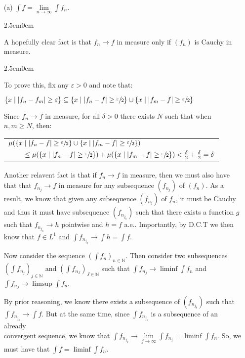 \documentclass{book}
\newcommand{\exTwoP}{%
   \color{RedViolet}%
   \fontsize{13}{15}\selectfont%
}
\newcommand{\exPPP}{%
   \color{VioletRed}%
   \fontsize{12}{14}\selectfont%
}
\newenvironment{myIndent}{%
   \begin{adjustwidth}{2.5em}{0em}%
}{%
   \end{adjustwidth}%
}
\newcommand{\retTwo}{\hfill\bigbreak}
\begin{document}
\begin{enumerate}
	\item[(a)] $\int f = \lim\limits_{n \rightarrow \infty}\int f_n$.
	
	\begin{myIndent}\exTwoP
		A hopefully clear fact is that $f_n \rightarrow f$ in measure only if $(f_n)$ is Cauchy in\\ measure. 
		\begin{myIndent}\exPPP
			To prove this, fix any $\varepsilon > 0$ and note that:
	
			{\centering $\{x \mid |f_n - f_m| \geq \varepsilon\} \subseteq \{x \mid |f_n - f| \geq \sfrac{\varepsilon}{2}\} \cup \{x \mid |f_m - f| \geq \sfrac{\varepsilon}{2}\}$ \retTwo\par}
	
			Since $f_n \rightarrow f$ in measure, for all $\delta > 0$ there exists $N$ such that when $n, m \geq N$, then:
	
			
			{\centering\begin{tabular}{l}
				$\mu(\{x \mid |f_n - f| \geq \sfrac{\varepsilon}{2}\} \cup \{x \mid |f_m - f| \geq \sfrac{\varepsilon}{2}\})$\\
				$\phantom{aaaa} \leq \mu(\{x \mid |f_n - f| \geq \sfrac{\varepsilon}{2}\}) + \mu(\{x \mid |f_m - f| \geq \sfrac{\varepsilon}{2}\}) < \frac{\delta}{2} + \frac{\delta}{2} = \delta$
			\end{tabular} \retTwo\par}
		\end{myIndent}

		Another relavent fact is that if $f_n \rightarrow f$ in measure, then we must also have that that $f_{n_j} \rightarrow f$ in measure for any subsequence $(f_{n_j})$ of $(f_n)$. As a result, we know that given any subsequence $(f_{n_j})$ of $f_n$, it must be Cauchy and thus it must have subsequence $(f_{n_{j_k}})$ such that there exists a function $g$ such that $f_{n_{j_k}} \rightarrow h$ pointwise and $h = f$ a.e.. Importantly, by D.C.T we then know that $f \in L^1$ and $\int f_{n_{j_k}} \rightarrow \int h = \int f$.\retTwo

		Now consider the sequence $(\int f_n)_{n \in \mathbb{N}}$. Then consider two subsequences $(\int f_{n_j})_{j \in \mathbb{N}}$ and $(\int f_{n_J})_{J \in \mathbb{N}}$ such that $\int f_{n_j} \rightarrow \liminf \int f_n$ and $\int f_{n_J} \rightarrow \limsup \int f_n$.\newpage

		By prior reasoning, we know there exists a subsequence of $(f_{n_{j_k}})$ such that\\ $\int f_{n_{j_k}} \rightarrow \int f$. But at the same time, since $\int f_{n_{j_k}}$ is a subsequence of an already\\ convergent sequence, we know that $\int f_{n_{j_k}} \rightarrow \lim\limits_{j \rightarrow \infty}\int f_{n_j} = \liminf \int f_n$. So, we\\ [-6pt] must have that $\int f = \liminf \int f_n$.\retTwo


\end{myIndent}
\end{enumerate}
\end{document}
